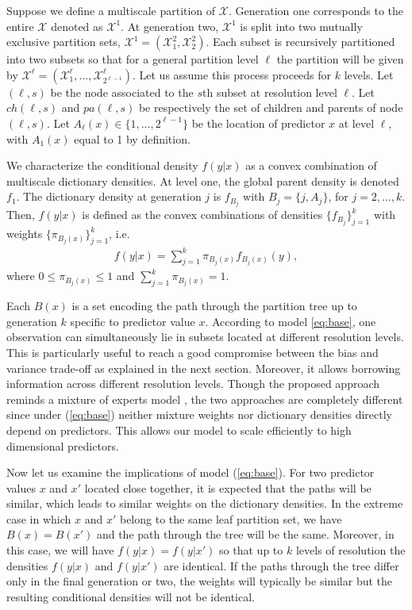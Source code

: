 \documentclass{article}
\begin{document}
Suppose we define a multiscale partition of $\mathcal{X}$.  Generation one corresponds to the entire $\mathcal{X}$ denoted as $\mathcal{X}^1$.  At generation two, $\mathcal{X}^1$ is split into two mutually exclusive partition sets, $\mathcal{X}^1=\left(\mathcal{X}^2_1, \mathcal{X}^2_2\right)$. Each subset is recursively partitioned into two subsets so that for a general partition level $\ell$ the partition will be given by $\mathcal{X}^{\ell}=\left(\mathcal{X}^{\ell}_1, \ldots, \mathcal{X}^{\ell}_{2^{\ell-1}}\right)$. Let us assume this process proceeds for $k$ levels. Let $(\ell,s)$ be the node associated to the $s$th subset at resolution level $\ell$. Let $ch(\ell,s)$ and $pa(\ell,s)$ be respectively the set of children and parents of node $(\ell, s)$. Let $A_{\ell}(x) \in \{1, \ldots, 2^{\ell-1}\}$ be the location of predictor $x$ at level $\ell$, with $A_1(x)$ equal to 1 by definition. 

We characterize the conditional density $f(y|x)$ as a convex combination of multiscale dictionary densities.  At level one, the global parent density is denoted $f_1$. The dictionary density at generation $j$ is $f_{B_j}$ with $B_j=\{j,A_j\}$, for $j=2,\ldots, k$. Then, $f(y|x)$ is defined as the convex combinations of densities $\{f_{B_j}\}_{j=1}^k$ with weights $\{\pi_{B_j(x)} \}_{j=1}^k$, i.e.
\begin{eqnarray}
f(y|x) = \sum_{j=1}^k \pi_{B_j(x)} f_{B_j(x)}(y),  \label{eq:base}
\end{eqnarray}
where $0 \le \pi_{B_j(x)} \le 1$ and $\sum_{j=1}^k \pi_{B_j(x)}=1$.

Each $B(x)$ is a set encoding the path through the partition tree up to generation $k$ specific to predictor value $x$. According to model \ref{eq:base}, one observation can simultaneously lie in subsets located at different resolution levels. This is particularly useful to reach a good compromise between the bias and variance trade-off as explained in the next section.  Moreover, it allows borrowing information across different resolution levels. Though the proposed approach reminds a mixture of experts model \cite{mixtureexperts}, the two approaches are  completely different since under (\ref{eq:base}) neither mixture weights nor dictionary densities directly depend on predictors. This allows our model to scale efficiently to high dimensional predictors.

Now let us examine the implications of model (\ref{eq:base}). For two predictor values $x$ and $x'$ located close together, it is expected that the paths will be similar, which leads to similar weights on the dictionary densities.  In the extreme case in which $x$ and $x'$ belong to the same leaf partition set, we have $B(x) = B(x')$ and the path through the tree will be the same.  Moreover, in this case, we will have $f(y|x)=f(y|x')$ so that up to $k$ levels of resolution the densities $f(y|x)$ and $f(y|x')$ are identical.  If the paths through the tree differ only in the final generation or two, the weights will typically be similar but the resulting conditional densities will not be identical. 
\end{document}
